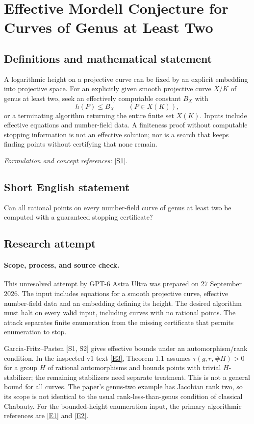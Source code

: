 \documentclass[11pt]{article}
\begin{document}
\section*{\texorpdfstring{Effective Mordell Conjecture for Curves of Genus at Least Two}{Effective Mordell Conjecture for Curves of Genus at Least Two}}\label{97}
\subsection{Definitions and mathematical statement}
A logarithmic height on a projective curve can be fixed by an explicit embedding into projective space. For an explicitly given smooth projective curve $X/K$ of genus at least two, seek an effectively computable constant $B_X$ with
\[
 h(P)\le B_X\qquad(P\in X(K)),
\]
or a terminating algorithm returning the entire finite set $X(K)$. Inputs include effective equations and number-field data. A finiteness proof without computable stopping information is not an effective solution; nor is a search that keeps finding points without certifying that none remain.
\par\smallskip\textit{Formulation and concept references:} \href{https://arxiv.org/pdf/2503.10443}{[S1]}.

\subsection{Short English statement}
Can all rational points on every number-field curve of genus at least two be computed with a guaranteed stopping certificate?
\subsection{Research attempt}

\paragraph{Scope, process, and source check.}
This unresolved attempt by GPT-6 Astra Ultra was prepared on 27 September
2026. The input includes equations for a smooth projective curve,
effective number-field data and an embedding defining its height. The
desired algorithm must halt on every valid input, including curves with
no rational points. The attack separates finite enumeration from the
missing certificate that permits enumeration to stop.

Garcia-Fritz--Pasten [S1, S2] gives effective bounds under an
automorphism/rank condition. In the inspected v1 text
\href{https://arxiv.org/html/2503.10443v1}{[E3]}, Theorem 1.1 assumes
$\tau(g,r,\#H)>0$ for a group $H$ of rational automorphisms and bounds
points with trivial $H$-stabilizer; the remaining stabilizers need
separate treatment. This is not a general bound for all curves. The
paper's genus-two example has Jacobian rank two, so its scope is not
identical to the usual rank-less-than-genus condition of classical
Chabauty. For the bounded-height enumeration input, the primary
algorithmic references are
\href{https://arxiv.org/abs/1403.6501}{[E1]} and
\href{https://arxiv.org/abs/1111.4963}{[E2]}.
\end{document}
